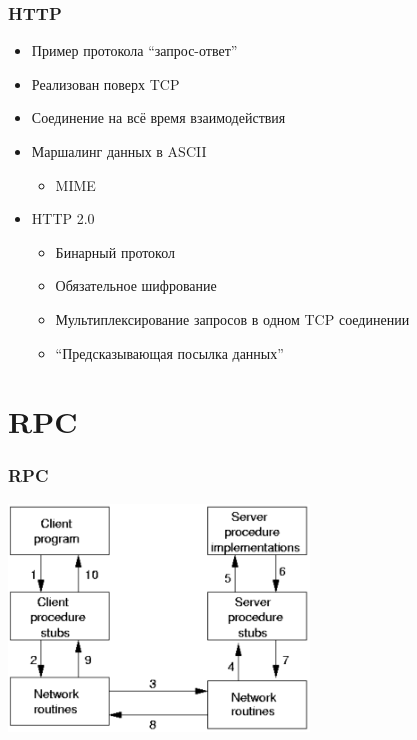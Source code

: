 \documentclass[xetex,mathserif,serif]{beamer}
\begin{document}
	\begin{frame}
		\frametitle{HTTP}
		\begin{itemize}
			\item Пример протокола ``запрос-ответ''
			\item Реализован поверх TCP
			\item Соединение на всё время взаимодействия
			\item Маршалинг данных в ASCII
			\begin{itemize}
				\item MIME
			\end{itemize}
			\item HTTP 2.0
			\begin{itemize}
				\item Бинарный протокол
				\item Обязательное шифрование
				\item Мультиплексирование запросов в одном TCP соединении
				\item ``Предсказывающая посылка данных''
			\end{itemize}
		\end{itemize}
	\end{frame}

	\section{RPC}

	\begin{frame}
		\frametitle{RPC}
		\begin{center}
			\includegraphics[width=0.6\textwidth]{rpc.png}
		\end{center}
	\end{frame}
\end{document}
